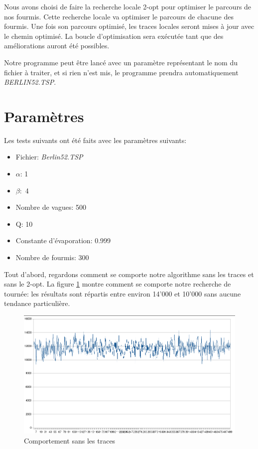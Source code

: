 \documentclass[a4paper, 11pt]{article}
\begin{document}
{	Nous avons choisi de faire la recherche locale 2-opt pour optimiser le parcours de nos fourmis. Cette recherche locale va optimiser le parcours de chacune des fourmis. Une fois son parcours optimisé, les traces locales seront mises à jour avec le chemin optimisé. La boucle d'optimisation sera exécutée tant que des améliorations auront été possibles.

	Notre programme peut être lancé avec un paramètre représentant le nom du fichier à traiter, et si rien n'est mis, le programme prendra automatiquement \textit{BERLIN52.TSP}.

\section{Paramètres}

Les tests suivants ont été faits avec les paramètres suivants:

\begin{itemize}
	\item{}Fichier: \textit{Berlin52.TSP}
	\item{}$\alpha$: 1
	\item{}$\beta:$ 4
	\item{}Nombre de vagues: 500
	\item{}Q: 10
	\item{}Constante d'évaporation: 0.999
	\item{}Nombre de fourmis: 300
\end{itemize}
\medskip

	Tout d'abord, regardons comment se comporte notre algorithme sans les traces et sans le 2-opt. La figure \ref{fig:1} montre comment se comporte notre recherche de tournée: les résultats sont répartis entre environ 14'000 et 10'000 sans aucune tendance particulière.
	
\begin{figure}[H]
   \begin{center}
      \includegraphics[width=14cm]{../images/1.png}
   \end{center}
   \caption{Comportement sans les traces}
	\label{fig:1}
\end{figure}

}
\end{document}

